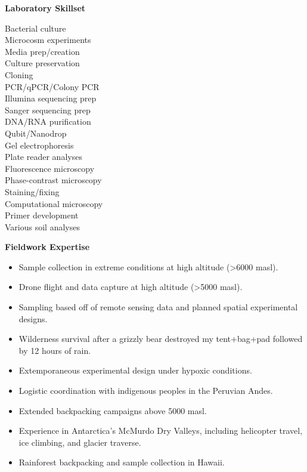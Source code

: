 \documentclass{article}
\begin{document}
\vspace{3mm}
{\large  \textbf{Laboratory Skillset}}
  \begin{adjustwidth}{2mm}{}\begin{multicols}{3}
    Bacterial culture\\
    Microcosm experiments\\
    Media prep/creation\\
    Culture preservation\\
    Cloning\\
    PCR/qPCR/Colony PCR\\
    Illumina sequencing prep\\
    Sanger sequencing prep\\
    DNA/RNA purification\\
    Qubit/Nanodrop\\
    Gel electrophoresis\\
    Plate reader analyses\\
    Fluorescence microscopy\\
    Phase-contrast microscopy\\
    Staining/fixing\\
    Computational microscopy\\
    Primer development\\
    Various soil analyses
  \end{multicols}\end{adjustwidth}

\pagebreak


{\large  \textbf{Fieldwork Expertise}}
\begin{itemize}[noitemsep,topsep=0pt, leftmargin=5mm]
  \item Sample collection in extreme conditions at high altitude (\textgreater6000 masl).
  \item Drone flight and data capture at high altitude (\textgreater5000 masl).
  \item Sampling based off of remote sensing data and planned spatial experimental designs.
  \item Wilderness survival after a grizzly bear destroyed my tent+bag+pad followed by 12 hours of rain.
  \item Extemporaneous experimental design under hypoxic conditions.
  \item Logistic coordination with indigenous peoples in the Peruvian Andes.
  \item Extended backpacking campaigns above 5000 masl.
  \item Experience in Antarctica’s McMurdo Dry Valleys, including helicopter travel, ice climbing, and glacier traverse.
  \item Rainforest backpacking and sample collection in Hawaii.

\end{itemize}
\end{document}
